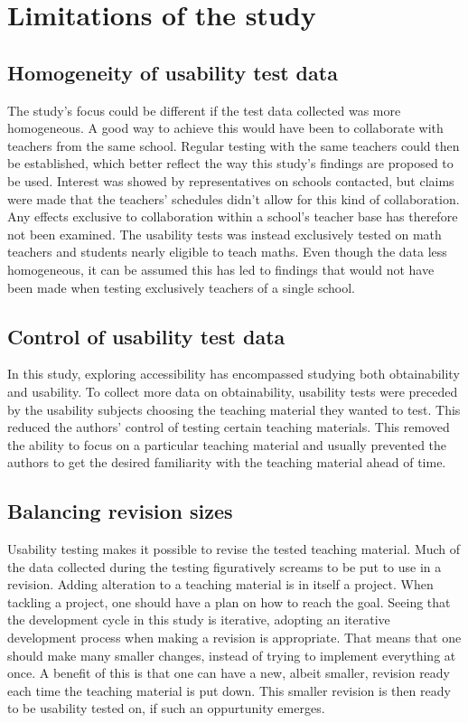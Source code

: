\section{Limitations of the study}
\subsection{Homogeneity of usability test data}
The study's focus could be different if the test data collected was more homogeneous. A good way to achieve this would have been to collaborate with teachers from the same school. Regular testing with the same teachers could then be established, which better reflect the way this study's findings are proposed to be used. Interest was showed by representatives on schools contacted, but claims were made that the teachers' schedules didn't allow for this kind of collaboration. 
Any effects exclusive to collaboration within a school's teacher base has therefore not been examined. The usability tests was instead exclusively tested on math teachers and students nearly eligible to teach maths. Even though the data less homogeneous, it can be assumed this has led to findings that would not have been made when testing exclusively teachers of a single school.

\subsection{Control of usability test data}
In this study, exploring accessibility has encompassed studying both obtainability and usability. To collect more data on obtainability, usability tests were preceded by the usability subjects choosing the teaching material they wanted to test. This reduced the authors' control of testing certain teaching materials. 
This removed the ability to focus on a particular teaching material and usually prevented the authors to get the desired familiarity with the teaching material ahead of time.

\subsection{Balancing revision sizes}
Usability testing makes it possible to revise the tested teaching material. Much of the data collected during the testing figuratively screams to be put to use in a revision. Adding alteration to a teaching material is in itself a project. When tackling a project, one should have a plan on how to reach the goal. Seeing that the development cycle in this study is iterative, adopting an iterative development process when making a revision is appropriate. 
That means that one should make many smaller changes, instead of trying to implement everything at once. A benefit of this is that one can have a new, albeit smaller, revision ready each time the teaching material is put down. This smaller revision is then ready to be usability tested on, if such an oppurtunity emerges. 

